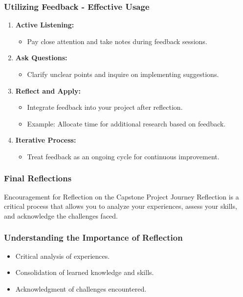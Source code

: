 \documentclass[aspectratio=169]{beamer}
\begin{document}
\begin{frame}[fragile]
    \frametitle{Utilizing Feedback - Effective Usage}
    \begin{enumerate}
        \item \textbf{Active Listening:}
        \begin{itemize}
            \item Pay close attention and take notes during feedback sessions.
        \end{itemize}

        \item \textbf{Ask Questions:}
        \begin{itemize}
            \item Clarify unclear points and inquire on implementing suggestions.
        \end{itemize}

        \item \textbf{Reflect and Apply:}
        \begin{itemize}
            \item Integrate feedback into your project after reflection.
            \item Example: Allocate time for additional research based on feedback.
        \end{itemize}
        
        \item \textbf{Iterative Process:}
        \begin{itemize}
            \item Treat feedback as an ongoing cycle for continuous improvement.
        \end{itemize}
    \end{enumerate}
\end{frame}

\begin{frame}[fragile]
    \frametitle{Final Reflections}
    \begin{block}{Encouragement for Reflection on the Capstone Project Journey}
        Reflection is a critical process that allows you to analyze your experiences, assess your skills, and acknowledge the challenges faced. 
    \end{block}
\end{frame}

\begin{frame}[fragile]
    \frametitle{Understanding the Importance of Reflection}
    \begin{itemize}
        \item Critical analysis of experiences.
        \item Consolidation of learned knowledge and skills.
        \item Acknowledgment of challenges encountered.
    \end{itemize}
\end{frame}
\end{document}
